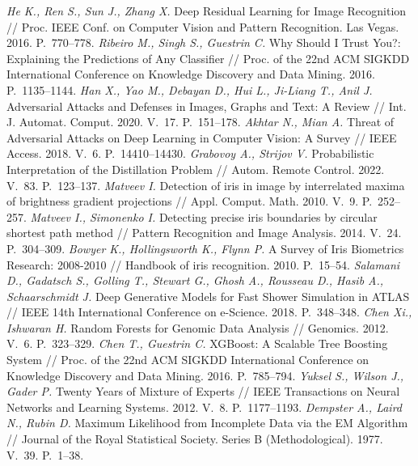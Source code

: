 \documentclass[12pt]{a&t}
\begin{document}
\begin{thebibliography}{}
	\textit{He K., Ren S., Sun J., Zhang X.} Deep Residual Learning for Image Recognition // Proc. IEEE Conf. on Computer Vision and Pattern Recognition. Las Vegas. 2016. P.~770--778.
	\textit{Ribeiro M., Singh S., Guestrin C.} Why Should I Trust You?: Explaining the Predictions of Any Classifier // Proc. of the 22nd ACM SIGKDD International Conference on Knowledge Discovery and Data Mining. 2016. P.~1135--1144.
	\textit{Han X., Yao M., Debayan D., Hui L., Ji-Liang T., Anil J.} Adversarial Attacks and Defenses in Images, Graphs and Text: A Review // Int. J. Automat. Comput. 2020. V.~17. P.~151--178.
	\textit{Akhtar N., Mian A.} Threat of Adversarial Attacks on Deep Learning in Computer Vision: A Survey // IEEE Access. 2018. V.~6. P.~14410--14430.
	\textit{Grabovoy A., Strijov V.} Probabilistic Interpretation of the Distillation Problem // Autom. Remote Control. 2022. V.~83. P.~123--137.
	\textit{Matveev I.} Detection of iris in image by interrelated maxima of brightness gradient projections // Appl. Comput. Math. 2010. V.~9. P.~252--257.
	\textit{Matveev I., Simonenko I.} Detecting precise iris boundaries by circular shortest path method // Pattern Recognition and Image Analysis. 2014. V.~24. P.~304--309.
	\textit{Bowyer K., Hollingsworth K., Flynn P.} A Survey of Iris Biometrics Research: 2008-2010 // Handbook of iris recognition. 2010. P.~15--54.
	\textit{Salamani D., Gadatsch S., Golling T.,  Stewart G., Ghosh A.,  Rousseau D.,  Hasib A.,  Schaarschmidt J.} Deep Generative Models for Fast Shower Simulation in ATLAS // IEEE 14th International Conference on e-Science. 2018. P.~348--348.
	\textit{Chen Xi., Ishwaran H.} Random Forests for Genomic Data Analysis // Genomics. 2012. V.~6. P.~323--329.
	\textit{Chen T., Guestrin C.} XGBoost: A Scalable Tree Boosting System // Proc. of the 22nd ACM SIGKDD International Conference on Knowledge Discovery and Data Mining. 2016. P.~785--794.
	\textit{Yuksel S., Wilson J., Gader P.} Twenty Years of Mixture of Experts // IEEE Transactions on Neural Networks and Learning Systems. 2012. V.~8. P.~1177--1193.
	\textit{Dempster A., Laird N., Rubin D.} Maximum Likelihood from Incomplete Data via the EM Algorithm // Journal of the Royal Statistical Society. Series B (Methodological). 1977. V.~39. P.~1--38.

\end{thebibliography}
\end{document}
